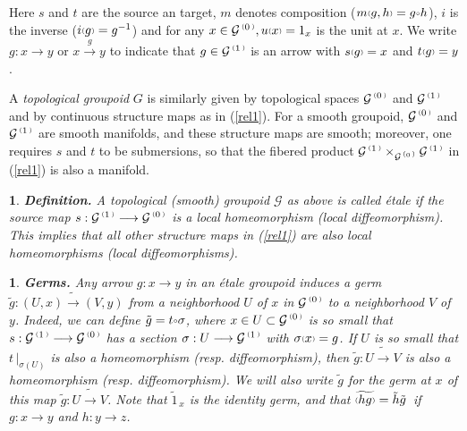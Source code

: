 \documentclass[a4paper]{article}
\newtheorem{num}[st]{}
\newcommand{\rmap}{\longrightarrow}
\newcommand{\G}{\ensuremath{\mathcal{G}}}
\newcommand{\ps}{{\raise 1pt\hbox{\tiny (}}}
\newcommand{\pd}{{\raise 1pt\hbox{\tiny )}}}
\newcommand{\nG}[1]{\ensuremath{\G^{\,\ps #1\,\pd}}}
\def\compose{{\raise 1pt\hbox{$\scriptscriptstyle\circ$}}}
\begin{document}
Here $s$ and $t$ are the source an target, $m$ denotes composition ($m\ps g, h\pd = g \compose h$), 
$i$ is the inverse ($i\ps g \pd = g^{-1}$) and for any $x\in \nG{0}, u\ps x \pd = 1_{x}$ is the unit 
at $x$. We write $g: x\rmap y$ or $x \stackrel{g}{\rmap} y$ to indicate that $g \in \nG{1}$ is an 
arrow with $s\ps g \pd = x$ and $t\ps g \pd = y$.\par
A {\it topological groupoid} $G$ is similarly given by topological spaces $\nG{0}$ and $\nG{1}$ and by 
continuous structure maps as in (\ref{rel1}). For a smooth groupoid, $\nG{0}$ and $\nG{1}$ are smooth manifolds, 
and these structure maps are smooth; moreover, one requires $s$ and $t$ to be submersions, so that the 
fibered product $\nG{1} \times_{\nG{0}} \nG{1}$ in (\ref{rel1}) is also a manifold.

\begin{num}
\emph{
{\bf Definition.} A topological (smooth) groupoid $\G$ as above is called \'etale if the source map $s: \nG{1} \rmap \nG{0}$ is a local homeomorphism (local diffeomorphism). This implies that all other structure maps in (\ref{rel1}) are also local homeomorphisms (local diffeomorphisms).
}
\end{num}



\begin{num}
\label{germ}
\emph{
{\bf Germs.} Any arrow $g: x\rmap y$ in an \'etale groupoid induces a germ $\tilde{g}: (U, x)\tilde{\rmap} (V, y)$ from a neighborhood $U$ of $x$ in $\nG{0}$ to a neighborhood $V$ of $y$. Indeed, we can define $\tilde{g} = t \compose \sigma$, where $x\in U \subset \nG{0}$ is so small that $s: \nG{1}\rmap \nG{0}$ has a section $\sigma: U\rmap \nG{1}$ with $\sigma\ps x \pd = g$. If $U$ is so small that $t\, |_{\sigma(U)}$ is also a homeomorphism (resp. diffeomorphism), then $\tilde{g}: U\tilde{\rmap} V$ is also a homeomorphism (resp. diffeomorphism). We will also write $\tilde{g}$ for the germ at $x$ of this map $\tilde{g}: U\tilde{\rmap} V$. Note that $\tilde{1}_{\, x}$ is the identity germ, and that $\widetilde{\ps hg \pd} = \tilde{h} \tilde{g}$\, if $g: x\rmap y$ and $h: y\rmap z$.
}
\end{num}
\end{document}
